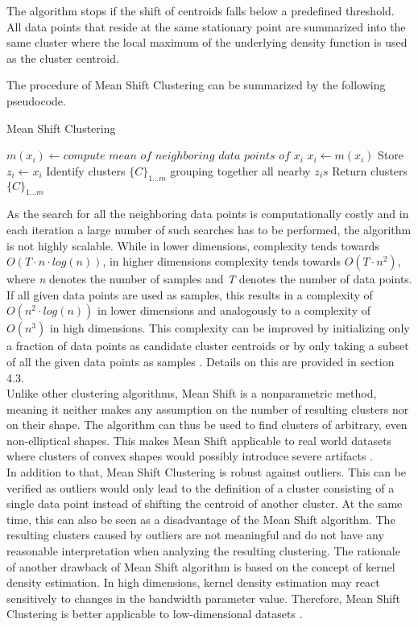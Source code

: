 The algorithm stops if the shift of centroids falls below a predefined threshold. All data points that reside at the same stationary point are summarized into the same cluster where the local maximum of the underlying density function is used as the cluster centroid. 

The procedure of Mean Shift Clustering can be summarized by the following pseudocode.
\begin{algorithm}[H]
	\caption{Mean Shift Clustering} 
	\begin{algorithmic}[1]
				\State $m(x_{i})\leftarrow compute$ $mean$ $of$ $neighboring$ $data$ $points$ $of$ $x_{i}$
				\State $x_{i}\leftarrow m(x_{i})$
			\EndWhile
			\State Store $z_{i}\leftarrow x_{i}$ 
		\EndFor
		\State Identify clusters $\{C\}_{1\ldots m}$ grouping together all nearby $z_{i}s$ 
		\State Return clusters $\{C\}_{1 \ldots m}$
	\end{algorithmic} 
\end{algorithm}

As the search for all the neighboring data points is computationally costly and in each iteration a large number of such searches has to be performed, the algorithm is not highly scalable. While in lower dimensions, complexity tends towards $O(T \cdot n \cdot log(n))$, in higher dimensions complexity tends towards $O(T \cdot n^{2})$, where \textit{n} denotes the number of samples and \textit{T} denotes the number of data points. If all given data points are used as samples, this results in a complexity of $O(n^{2} \cdot log(n))$ in lower dimensions and analogously to a complexity of $O(n^{3})$ in high dimensions. This complexity can be improved by initializing only a fraction of data points as candidate cluster centroids or by only taking a subset of all the given data points as samples \cite{sklearn_api}. Details on this are provided in section 4.3. \\
Unlike other clustering algorithms, Mean Shift is a nonparametric method, meaning it neither makes any assumption on the number of resulting clusters nor on their shape. The algorithm can thus be used to find clusters of arbitrary, even non-elliptical shapes. This makes Mean Shift applicable to real world datasets where clusters of convex shapes would possibly introduce severe artifacts \cite{comaniciu2002MeanShift}.\\
In addition to that, Mean Shift Clustering is robust against outliers. This can be verified as outliers would only lead to the definition of a cluster consisting of a single data point instead of shifting the centroid of another cluster. At the same time, this can also be seen as a disadvantage of the Mean Shift algorithm.
The resulting clusters caused by outliers are not meaningful and do not have any reasonable interpretation when analyzing the resulting clustering. 
The rationale of another drawback of Mean Shift algorithm is based on the concept of kernel density estimation. In high dimensions, kernel density estimation may react sensitively to changes in the bandwidth parameter value. Therefore, Mean Shift Clustering is better applicable to low-dimensional datasets \cite{CarreiraPerpin2015ARO}.